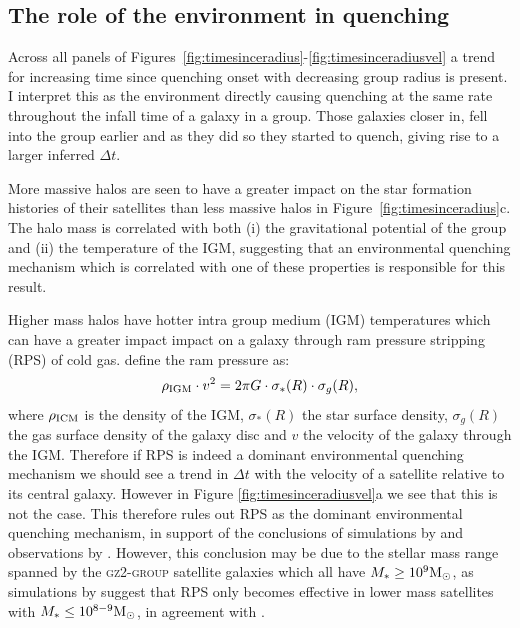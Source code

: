 \subsection{The role of the environment in quenching}\label{sec:roleenv}

Across all panels of Figures~\ref{fig:timesinceradius}-\ref{fig:timesinceradiusvel} a trend for increasing time since quenching onset with decreasing group radius is present. I interpret this as the environment directly causing quenching at the same rate throughout the infall time of a galaxy in a group. Those galaxies closer in, fell into the group earlier and as they did so they started to quench, giving rise to a larger inferred $\Delta t$.

More massive halos are seen to have a greater impact on the star formation histories of their satellites than less massive halos in Figure~\ref{fig:timesinceradius}c. The halo mass is correlated with both (i) the gravitational potential of the group and (ii) the temperature of the IGM, suggesting that an environmental quenching mechanism which is correlated with one of these properties is responsible for this result.

Higher mass halos have hotter intra group medium (IGM) temperatures \citep{shimizu03, delpopolo05} which can have a greater impact impact on a galaxy through ram pressure stripping (RPS) of cold gas. \cite{gunngott72} define the ram pressure as:
\begin{equation}\label{eq:rps}
\rho_{\rm{IGM}}\cdot v^2 = 2\pi G \cdot \sigma_*(R) \cdot \sigma_g(R),
\end{equation}
where $\rho_{\rm{ICM}}$ is the density of the IGM, $\sigma_*(R)$ the star surface density, $\sigma_g(R)$ the gas surface density of the galaxy disc and $v$ the velocity of the galaxy through the IGM. Therefore if RPS is indeed a dominant environmental quenching mechanism we should see a trend in $\Delta t$ with the velocity of a satellite relative to its central galaxy.  However in Figure \ref{fig:timesinceradiusvel}a we see that this is not the case. This therefore rules out RPS as the dominant environmental quenching mechanism, in support of the conclusions of simulations by \citet{emerick16, fillingham16} and observations by \citet{mcgee14}. However, this conclusion may be due to the stellar mass range spanned by the \textsc{gz2-group} satellite galaxies which all have $M_* \geq 10^9 \rm{M}_{\odot}$, as simulations by \cite{fillingham16} suggest that RPS only becomes effective in lower mass satellites with $M_* \leq 10^{8-9} \rm{M}_{\odot}$, in agreement with \cite{hester06}. 

